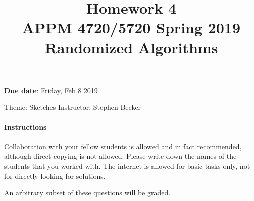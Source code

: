 \documentclass[10pt, letterpaper]{scrartcl}
\title{Homework 4 \solTitle{Selected Solutions} \\APPM 4720/5720 Spring 2019 \\ Randomized Algorithms}
\date{}
\newenvironment{instructions}{}{}
\begin{document}
\maketitle
\vspace{-6em}
\textbf{Due date}: Friday, Feb 8 2019

Theme: Sketches   \hfill Instructor: Stephen Becker %

\begin{instructions}
\paragraph{Instructions}
Collaboration with your fellow students is allowed and in fact recommended, although direct copying is not allowed.  Please write down the names of the students that you worked with. The internet is allowed for basic tasks only, not for directly looking for solutions.

An arbitrary subset of these questions will be graded.

%
%
\end{instructions}
\end{document}
